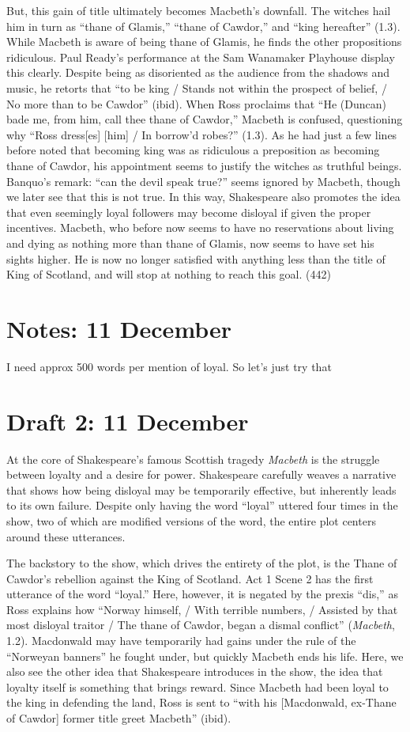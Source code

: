\documentclass[12pt]{article}[titlepage]
\newcommand{\say}[1]{``#1''}
\newcommand{\1}{\={a}}
\newcommand{\2}{\={e}}
\newcommand{\3}{\={\i}}
\newcommand{\4}{\=o}
\newcommand{\5}{\=u}
\newcommand{\6}{\={A}}
\renewcommand{\,}{\textsuperscript{,}}
\begin{document}
But, this gain of title ultimately becomes Macbeth's downfall.
The witches hail him in turn as \say{thane of Glamis,} \say{thane of Cawdor,} and \say{king hereafter} (1.3).
While Macbeth is aware of being thane of Glamis, he finds the other propositions ridiculous.
Paul Ready's performance at the Sam Wanamaker Playhouse display this clearly.
Despite being as disoriented as the audience from the shadows and music, he retorts that \say{to be king / Stands not within the prospect of belief, / No more than to be Cawdor} (ibid).
When Ross proclaims that \say{He (Duncan) bade me, from him, call thee thane of Cawdor,} Macbeth is confused, questioning why \say{Ross dress[es] [him] / In borrow'd robes?} (1.3).
As he had just a few lines before noted that becoming king was as ridiculous a preposition as becoming thane of Cawdor, his appointment seems to justify the witches as truthful beings.
Banquo's remark: \say{can the devil speak true?} seems ignored by Macbeth, though we later see that this is not true.
In this way, Shakespeare also promotes the idea that even seemingly loyal followers may become disloyal if given the proper incentives.
Macbeth, who before now seems to have no reservations about living and dying as nothing more than thane of Glamis, now seems to have set his sights higher.
He is now no longer satisfied with anything less than the title of King of Scotland, and will stop at nothing to reach this goal.
(442)
\section{Notes: 11 December}
I need approx 500 words per mention of loyal. So let's just try that
\section{Draft 2: 11 December}
At the core of Shakespeare's famous Scottish tragedy \textit{Macbeth} is the struggle between loyalty and a desire for power.
Shakespeare carefully weaves a narrative that shows how being disloyal may be temporarily effective, but inherently leads to its own failure.
Despite only having the word \say{loyal} uttered four times in the show, two of which are modified versions of the word, the entire plot centers around these utterances.

The backstory to the show, which drives the entirety of the plot, is the Thane of Cawdor's rebellion against the King of Scotland. 
Act 1 Scene 2 has the first utterance of the word \say{loyal.}
Here, however, it is negated by the prexis \say{dis,} as Ross explains how \say{Norway himself, / With terrible numbers, / Assisted by that most disloyal traitor / The thane of Cawdor, began a dismal conflict} (\textit{Macbeth}, 1.2).
Macdonwald may have temporarily had gains under the rule of the \say{Norweyan banners} he fought under, but quickly Macbeth ends his life.
Here, we also see the other idea that Shakespeare introduces in the show, the idea that loyalty itself is something that brings reward.
Since Macbeth had been loyal to the king in defending the land, Ross is sent to \say{with his [Macdonwald, ex-Thane of Cawdor] former title greet Macbeth} (ibid).
\end{document}
